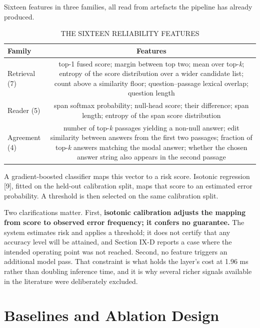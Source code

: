 \documentclass[conference]{IEEEtran}
\begin{document}
Sixteen features in three families, all read from artefacts the pipeline has already produced.

\begin{table}[t]\centering\caption{THE SIXTEEN RELIABILITY FEATURES}\label{tab:2}\footnotesize
\begin{tabular}{lc}\hline
\textbf{Family} & \textbf{Features} \\ \hline
Retrieval (7) & top-1 fused score; margin between top two; mean over top-\emph{k}; entropy of the score distribution over a wider candidate list; count above a similarity floor; question--passage lexical overlap; question length \\
Reader (5) & span softmax probability; null-head score; their difference; span length; entropy of the span score distribution \\
Agreement (4) & number of top-\emph{k} passages yielding a non-null answer; edit similarity between answers from the first two passages; fraction of top-\emph{k} answers matching the modal answer; whether the chosen answer string also appears in the second passage \\
\hline\end{tabular}\end{table}

A gradient-boosted classifier maps this vector to a risk score. Isotonic regression [9], fitted on the held-out calibration split, maps that score to an estimated error probability. A threshold is then selected on the same calibration split.

Two clarifications matter. First, \textbf{isotonic calibration adjusts the mapping from score to observed error frequency; it confers no guarantee.} The system estimates risk and applies a threshold; it does not certify that any accuracy level will be attained, and Section IX-D reports a case where the intended operating point was not reached. Second, no feature triggers an additional model pass. That constraint is what holds the layer's cost at 1.96 ms rather than doubling inference time, and it is why several richer signals available in the literature were deliberately excluded.

\section{Baselines and Ablation Design}
\end{document}
